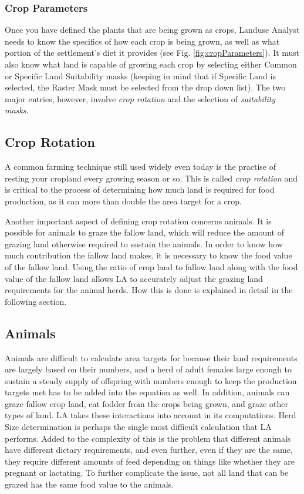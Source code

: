   \subsubsection{Crop Parameters}
  \label{cropParameters}
  Once you have defined the plants that are being grown as crops, Landuse
  Analyst needs to know the specifics of how each crop is being grown, as well
  as what portion of the settlement's diet it provides (see Fig.
  \ref{fig:cropParameters}).  It must also know what land is capable of growing
  each crop by selecting either Common or Specific Land Suitability masks
  (keeping in mind that if Specific Land is selected, the Raster Mask must be
  selected from the drop down list).  The two major entries, however, involve
  \textit{crop rotation} and the selection of \textit{suitability masks}.

    \subsection{Crop Rotation}
    \label{cropRotation}
    A common farming technique still used widely even today is the practise of
    resting your cropland every growing season or so.  This is called
    \textit{crop rotation} and is critical to the process of determining how
    much land is required for food production, as it can more than double the
    area target for a crop. 

    Another important aspect of defining crop rotation concerns animals.  It is
    possible for animals to graze the fallow land, which will reduce the amount
    of grazing land otherwise required to sustain the animals.  In order to
    know how much contribution the fallow land makes, it is necessary to know
    the food value of the fallow land.  Using the ratio of crop land to fallow
    land along with the food value of the fallow land allows LA to
    accurately adjust the grazing land requirements for the animal herds.  How
    this is done is explained in detail in the following section.

\subsection{Animals}
Animals are difficult to calculate area targets for because their land
requirements are largely based on their numbers, and a herd of adult
females large enough to sustain a steady supply of offspring with numbers
enough to keep the production targets met has to be added into the equation as
well.  In addition, animals can graze fallow crop land, eat fodder from
the crops being grown, and graze other types of land.  LA takes these
interactions into account in its computations.
Herd Size determination is perhaps the single most difficult calculation that
LA performs.  Added to the complexity of this is the problem that different
animals have different dietary requirements, and even further, even if they
are the same, they require different amounts of feed depending on things like
whether they are pregnant or lactating.  To further complicate the issue, not
all land that can be grazed has the same food value to the animals.

